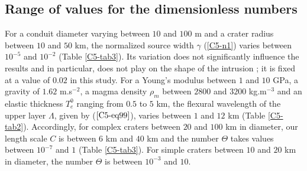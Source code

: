 	
\subsection{Range of values for the dimensionless numbers}
\label{C5-Dimensionless_Number}
	 
For a conduit  diameter varying between $10$ and $100$  m and a crater
radius between $10$ and $50$  km, the normalized source width $\gamma$
(\ref{C5-n1})   varies   between   $10^{-5}$  and   $10^{-2}$   (Table
\ref{C5-tab3}).  Its  variation does  not significantly  influence the
results and in particular, does not play on the shape of the intrusion
\citep{Michaut:2011kg} ;  it is  fixed at  a value  of $0.02$  in this
study. For  a Young's modulus between  $1$ and $10$ GPa,  a gravity of
$1.62$ m.s$^{-2}$, a magma density  $\rho_m$ between $2800$ and $3200$
kg.m$^{-3}$ and an elastic thickness $T_e^0$ ranging from $0.5$ to $5$
km, the  flexural wavelength  of the upper  layer $\Lambda$,  given by
($\ref{C5-eq99}$),   varies   between   $1$   and   $12$   km   (Table
\ref{C5-tab2}).   Accordingly, for  complex craters  between $20$  and
$100$ km in diameter, our length scale  $C$ is between $6$ km and $40$
km  and the  number $\Theta$  takes values  between $10^{-7}$  and $1$
(Table \ref{C5-tab3}).  For simple craters between $10$ and $20$ km in
diameter, the number $\Theta$ is between $10^{-3}$ and $10$.

